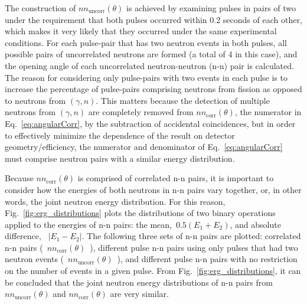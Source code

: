 The construction of $nn_{\text{uncorr}}(\theta)$ is achieved by examining pulses in pairs of two under the requirement that both pulses occurred within 0.2 seconds of each other, which makes it very likely that they occurred under the same experimental conditions.
For each pulse-pair that has two neutron events in both pulses, all possible pairs of uncorrelated neutrons are formed (a total of 4 in this case), and the opening angle of each uncorrelated neutron-neutron (n-n) pair is calculated.
The reason for considering only pulse-pairs with two events in each pulse is to increase the percentage of pulse-pairs comprising neutrons from fission as opposed to neutrons from $(\gamma,n)$.
This matters because the detection of multiple neutrons from $(\gamma,n)$ are completely removed from $nn_{\text{corr}}(\theta)$, the numerator in Eq.~\ref{eq:angularCorr}, by the subtraction of accidental coincidences, but in order to effectively minimize the dependence of the result on detector geometry/efficiency, the numerator and denominator of Eq.~\ref{eq:angularCorr} must comprise neutron pairs with a similar energy distribution.

Because $nn_{\text{corr}}(\theta)$ is comprised of correlated n-n pairs, it is important to consider how the energies of both neutrons in n-n pairs vary together, or, in other words, the joint neutron energy distribution.
For this reason, Fig.~\ref{fig:erg_distributions} plots the distributions of two binary operations applied to the energies of n-n pairs: the mean,~$0.5(E_{1} + E_{2})$, and absolute difference, ~$|E_1 - E_2|$.
The following three sets of n-n pairs are plotted: correlated n-n pairs (~$nn_{\text{corr}}(\theta)$~), different pulse n-n pairs using only pulses that had two neutron events (~$nn_{\text{uncorr}}(\theta)$~), and different pulse n-n pairs with no restriction on the number of events in a given pulse.
From Fig.~\ref{fig:erg_distributions}, it can be concluded that the joint neutron energy distributions of n-n pairs from $nn_{\text{uncorr}}(\theta)$ and $nn_{\text{corr}}(\theta)$ are very similar.

